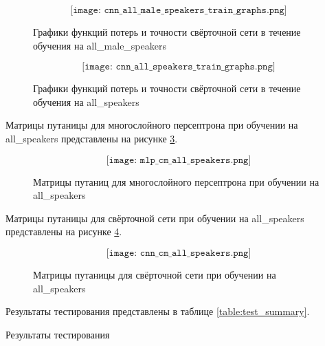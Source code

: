 \begin{figure}[H]
	\[\texttt{[image: cnn\_all\_male\_speakers\_train\_graphs.png]}\]
	\caption{Графики функций потерь и точности свёрточной сети в течение обучения на all\_male\_speakers}
	\label{fig:cnn_all_male_speakers_train_graphs}
\end{figure}

\begin{figure}[H]
	\[\texttt{[image: cnn\_all\_speakers\_train\_graphs.png]}\]
	\caption{Графики функций потерь и точности свёрточной сети в течение обучения на all\_speakers}
	\label{fig:cnn_all_speakers_train_graphs}
\end{figure}

Матрицы путаницы для многослойного персептрона при обучении на all\_speakers представлены на рисунке \ref{fig:mlp_cm_all_speakers}.

\begin{figure}[H]
	\[\texttt{[image: mlp\_cm\_all\_speakers.png]}\]
	\caption{Матрицы путаниц для многослойного персептрона при обучении на all\_speakers}
	\label{fig:mlp_cm_all_speakers}
\end{figure}


Матрицы путаницы для свёрточной сети при обучении на all\_speakers представлены на рисунке \ref{fig:cnn_cm_all_speakers}.

\begin{figure}[H]
	\[\texttt{[image: cnn\_cm\_all\_speakers.png]}\]
	\caption{Матрицы путаницы для свёрточной сети при обучении на all\_speakers}
	\label{fig:cnn_cm_all_speakers}
\end{figure}

Результаты тестирования представлены в таблице \ref{table:test_summary}. 

\begin{table}[H]
\small
\centering
{}
\caption{Результаты тестирования}
\label{table:test_summary}
\end{table}

